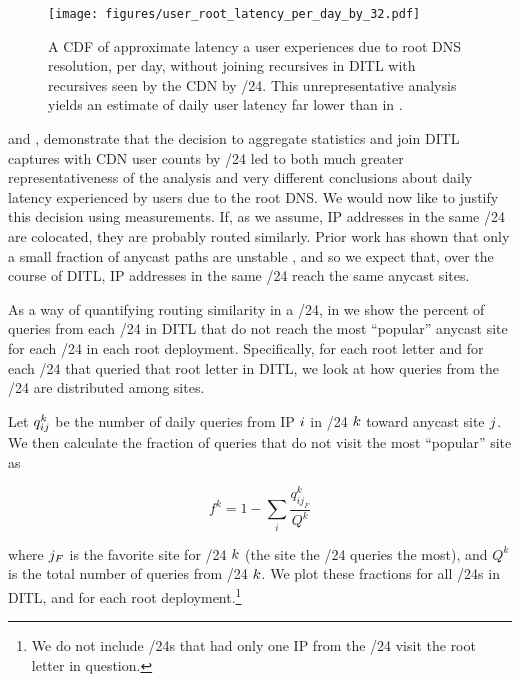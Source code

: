 \documentclass[sigconf,letterpaper,nonacm,10pt,anonymous]{acmart}
\begin{document}
\begin{figure}
    \centering
    \texttt{[image: figures/user\_root\_latency\_per\_day\_by\_32.pdf]}
    \caption{A CDF of approximate latency a user experiences due to root DNS resolution, per day, without joining recursives in DITL with recursives seen by the CDN by /24. This unrepresentative analysis yields an estimate of daily user latency far lower than in . }
    \label{fig:user_root_latency_per_day_by_32}
\end{figure}

 and
, demonstrate that the
decision to aggregate statistics and join DITL captures with CDN user
counts by /24 led to both much greater representativeness of the
analysis and very different conclusions about daily latency experienced
by users due to the root DNS. We would now like to justify this decision
using measurements. If, as we assume, IP addresses in the same /24 are
colocated, they are probably routed similarly. Prior work has shown that
only a small fraction of anycast paths are unstable \cite{wei2017does},
and so we expect that, over the course of DITL, IP addresses in the same
/24 reach the same anycast sites.

As a way of quantifying routing similarity in a /24, in
 we show the percent of queries from
each /24 in DITL that do not reach the most ``popular'' anycast site for
each /24 in each root deployment. Specifically, for each root letter and
for each /24 that queried that root letter in DITL, we look at how
queries from the /24 are distributed among sites.

Let \(\mathnormal{q^{k}_{ij}}\) be the number of daily queries from IP
\(\mathnormal{i}\) in /24 \(\mathnormal{k}\) toward anycast site
\(\mathnormal{j}\). We then calculate the fraction of queries that do
not visit the most ``popular'' site as

\begin{equation}
f^k = 1 - \underset{i}{\sum} \frac{q^k_{i j_{F}}}{Q^k}
\end{equation}

where \(\mathnormal{j_F}\) is the favorite site for /24
\(\mathnormal{k}\) (\ie the site the /24 queries the most), and \(Q^k\)
is the total number of queries from /24 \(\mathnormal{k}\). We plot
these fractions for all /24s in DITL, and for each root
deployment.\footnote{We do not include /24s that had only one IP from
  the /24 visit the root letter in question.}
\end{document}
